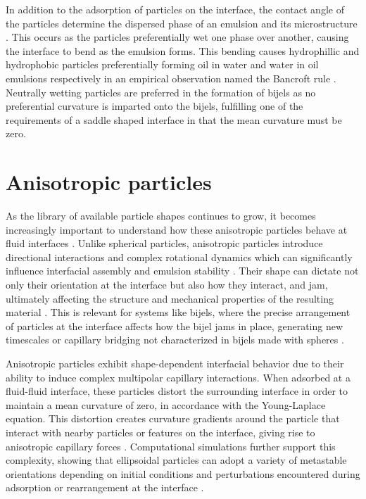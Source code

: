 In addition to the adsorption of particles on the interface, the contact angle of the particles determine the dispersed phase of an emulsion and its 
microstructure \cite{velankar_non-equilibrium_2015}.
This occurs as the particles preferentially wet one phase over another, causing the interface to bend as the emulsion forms. This bending causes hydrophillic and hydrophobic particles preferentially 
forming oil in water and water in oil emulsions respectively in an empirical observation named the Bancroft rule \cite{ngai_particle-stabilized_2015}.
Neutrally wetting particles are preferred in the formation of bijels as no preferential curvature is imparted onto the bijels, fulfilling one of the requirements of a saddle shaped interface
in that the mean curvature must be zero. \cite{jinnai_interfacial_2001}

\section{Anisotropic particles}

As the library of available particle shapes continues to grow, it becomes increasingly important to understand how these anisotropic particles behave at fluid interfaces
\cite{wu_recent_2016, cavallaro_curvature-driven_2011}.
Unlike spherical particles, anisotropic particles introduce directional interactions and complex rotational dynamics which can significantly 
influence interfacial assembly and emulsion stability \cite{read_dimerization_2020, davies_dipolar_2015,morgan_understanding_2013}. 
Their shape can dictate not only their orientation at the interface but also how they interact, and jam, 
ultimately affecting the structure and mechanical properties of the resulting material \cite{hijnen_bijels_2015}.
This is relevant for systems like bijels, where the precise arrangement of particles at the interface affects how the bijel jams in place, generating new timescales or 
capillary bridging not characterized in bijels made with spheres \cite{gunther_timescales_2014,hijnen_bijels_2015,witt_bijel_2013}.

Anisotropic particles exhibit shape-dependent interfacial behavior due to their ability to induce complex multipolar capillary interactions. When adsorbed at a fluid-fluid interface, these 
particles distort the surrounding interface in order to maintain a mean curvature of zero, in accordance with the Young-Laplace equation. This distortion creates curvature gradients around the 
particle that interact with nearby particles or features on the interface, giving rise to anisotropic capillary forces \cite{loudet_capillary_2005, cheng_shape-anisotropic_2013}. 
Computational simulations further support this complexity, showing that ellipsoidal particles can adopt a variety of metastable orientations 
depending on initial conditions and perturbations encountered during adsorption or rearrangement at the interface \cite{gunther_lattice_2013, newton_influence_2014}. 

